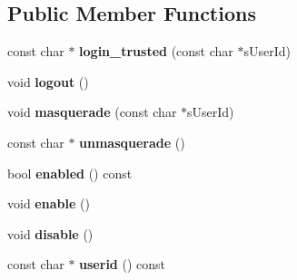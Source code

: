 \subsection*{\-Public \-Member \-Functions}
\begin{DoxyCompactItemize}
\item 
\hypertarget{classgeneral__server_1_1SecurityContext_addfc0f6b4a928878b23e2dc72eb1afcb}{const char $\ast$ {\bfseries login\-\_\-trusted} (const char $\ast$s\-User\-Id)}\label{classgeneral__server_1_1SecurityContext_addfc0f6b4a928878b23e2dc72eb1afcb}

\item 
\hypertarget{classgeneral__server_1_1SecurityContext_aa1044e06c162c036536295e7d21d9e85}{void {\bfseries logout} ()}\label{classgeneral__server_1_1SecurityContext_aa1044e06c162c036536295e7d21d9e85}

\item 
\hypertarget{classgeneral__server_1_1SecurityContext_aa3fbc2ce2bd52e6baf3562279a4df5ae}{void {\bfseries masquerade} (const char $\ast$s\-User\-Id)}\label{classgeneral__server_1_1SecurityContext_aa3fbc2ce2bd52e6baf3562279a4df5ae}

\item 
\hypertarget{classgeneral__server_1_1SecurityContext_a54914ba4a59c903d0c43956fd3af4e07}{const char $\ast$ {\bfseries unmasquerade} ()}\label{classgeneral__server_1_1SecurityContext_a54914ba4a59c903d0c43956fd3af4e07}

\item 
\hypertarget{classgeneral__server_1_1SecurityContext_acdd12447ea9926449e0a494fefc0e66e}{bool {\bfseries enabled} () const }\label{classgeneral__server_1_1SecurityContext_acdd12447ea9926449e0a494fefc0e66e}

\item 
\hypertarget{classgeneral__server_1_1SecurityContext_a90c11c3618a89ebee9a37d2e8abbd9a3}{void {\bfseries enable} ()}\label{classgeneral__server_1_1SecurityContext_a90c11c3618a89ebee9a37d2e8abbd9a3}

\item 
\hypertarget{classgeneral__server_1_1SecurityContext_a59b70288afc64b9ddec25a38e08ca2f6}{void {\bfseries disable} ()}\label{classgeneral__server_1_1SecurityContext_a59b70288afc64b9ddec25a38e08ca2f6}

\item 
\hypertarget{classgeneral__server_1_1SecurityContext_a071241da8dbba404a2a910785f36d9c8}{const char $\ast$ {\bfseries userid} () const }\label{classgeneral__server_1_1SecurityContext_a071241da8dbba404a2a910785f36d9c8}


\end{DoxyCompactItemize}
